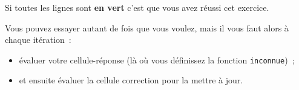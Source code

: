 Si toutes les lignes sont \textbf{en vert} c'est que vous avez réussi
cet exercice.

    Vous pouvez essayer autant de fois que vous voulez, mais il vous faut
alors à chaque itération~:

\begin{itemize}
\tightlist
\item
  évaluer votre cellule-réponse (là où vous définissez la fonction
  \texttt{inconnue})~;
\item
  et ensuite évaluer la cellule correction pour la mettre à jour.
\end{itemize}


    
    
    
